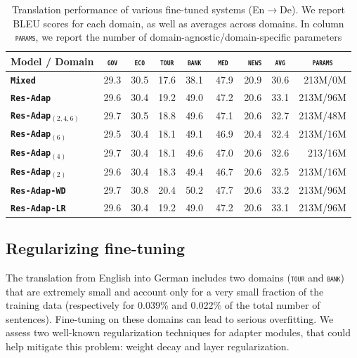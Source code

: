 \documentclass[11pt,a4paper]{article}
\newcommand{\fyDone}[1]{\done[FY]\Todo[FY:]{\textcolor{orange}{#1}}}
\newcommand{\domain}[1]{\texttt{\textsc{#1}}}
\newcommand{\system}[1]{\texttt{\textbf{#1}}}
\begin{document}
\begin{table}[htbp]
  \centering
  \fyDone{Fix column size}
  \begin{tabular}{|p{3cm}|*{8}{r|}} \hline
    Model / Domain & \multicolumn{1}{c|}{\domain{gov}} & \multicolumn{1}{c|}{\domain{eco}} & \multicolumn{1}{c|}{\domain{tour}} & \multicolumn{1}{c|}{\domain{bank}} & \multicolumn{1}{c|}{\domain{ med }} & \multicolumn{1}{c|}{\domain{ news}} & \multicolumn{1}{c|}{\domain{avg}} & \multicolumn{1}{c|}{\domain{params}} \\ \hline
    \system{Mixed}          & 29.3 & 30.5 & 17.6 & 38.1 & 47.9 & 20.9  & 30.6 & 213M/0M\\
   \system{Res-Adap}     & 29.6 & 30.4 & 19.2 & 49.0 & 47.2 & 20.6 & 33.1 & 213M/96M \\ \hline
    \system{Res-Adap$_{(2,4,6)}$} & 29.7  & 30.5 & 18.8 & 49.6 & 47.1 & 20.6 &  32.7 & 213M/48M \\ \hline
    \system{Res-Adap$_{(6)}$}      & 29.5 & 30.4 & 18.1 & 49.1 & 46.9 & 20.4 & 32.4 & 213M/16M \\
   \system{Res-Adap$_{(4)}$}       & 29.7 & 30.4 & 18.1 & 49.6 & 47.0 & 20.6 & 32.6 & 213/16M\\
   \system{Res-Adap$_{(2)}$}       & 29.6 & 30.4 & 18.3 & 49.4 & 46.7 & 20.6 & 32.5  & 213M/16M\\
    \system{Res-Adap-WD}         & 29.7 & 30.8 & 20.4 & 50.2 & 47.7 & 20.6 & 33.2 & 213M/96M \\
    \system{Res-Adap-LR}           & 29.6 & 30.4 & 19.2 & 49.0 & 47.2 & 20.6 & 33.1  & 213M/96M\\
    \hline
  \end{tabular}
  \caption{Translation performance of various fine-tuned systems (En$\rightarrow$De). We report BLEU scores for each domain, as well as averages across domains. In column \domain{params}, we report the number of domain-agnostic/domain-specific parameters}
  \label{tab:performance-en-de-pos-reg}
\end{table}

\subsection{Regularizing fine-tuning \label{ssec:regularization-exp}}

The translation from English into German includes two domains (\domain{tour} and \domain{bank}) that are extremely small and account only for a very small fraction of the training data (respectively for 0.039\% and 0.022\% of the total number of sentences). Fine-tuning on these domains can lead to serious overfitting. We assess two well-known regularization techniques for adapter modules, that could help mitigate this problem: weight decay and layer regularization. 
\end{document}
